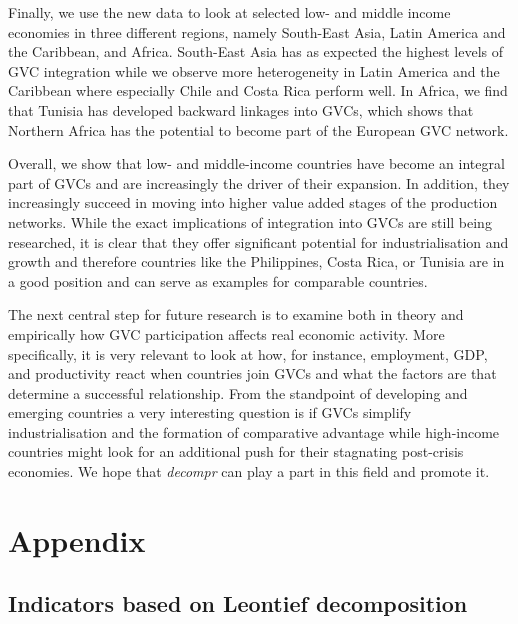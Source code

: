 \documentclass[a4paper,11pt]{article}
\begin{document}
Finally, we use the new data to look at selected low- and middle income economies in three different regions, namely South-East Asia, Latin America and the Caribbean, and Africa. South-East Asia has as expected the highest levels of GVC integration while we observe more heterogeneity in Latin America and the Caribbean where especially Chile and Costa Rica perform well. In Africa, we find that Tunisia has developed backward linkages into GVCs, which shows that Northern Africa has the potential to become part of the European GVC network.

Overall, we show that low- and middle-income countries have become an integral part of GVCs and are increasingly the driver of their expansion. In addition, they increasingly succeed in moving into higher value added stages of the production networks. While the exact implications of integration into GVCs are still being researched, it is clear that they offer significant potential for industrialisation and growth and therefore countries like the Philippines, Costa Rica, or Tunisia are in a good position and can serve as examples for comparable countries.

The next central step for future research is to examine both in theory and empirically how GVC participation affects real economic activity. More specifically, it is very relevant to look at how, for instance, employment, GDP, and productivity react when countries join GVCs and what the factors are that determine a successful relationship. 
From the standpoint of developing and emerging countries a very interesting question is if GVCs simplify industrialisation and the formation of comparative advantage while high-income countries might look for an additional push for their stagnating post-crisis economies. We hope that \textit{decompr} can play a part in this field and promote it.



\newpage




\clearpage

 \appendix
 
\section{Appendix}
\subsection{Indicators based on Leontief decomposition}
\end{document}
